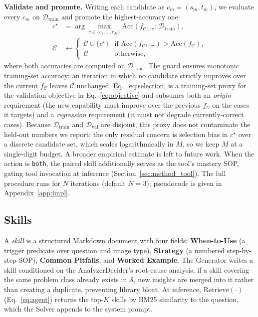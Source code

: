 \textbf{Validate and promote.}
Writing each candidate as $c_m = (s_m, t_m)$, we evaluate every $c_m$ on
$\mathcal{D}_{\text{train}}$ and promote the highest-accuracy one:
\begin{equation}
\begin{aligned}
  c^{\star} &= \arg\max_{c \in \{c_1, \dots, c_M\}}
              \mathrm{Acc}\!\left(f_{\mathcal{C} \cup c};\, \mathcal{D}_{\text{train}}\right), \\
  \mathcal{C} &\leftarrow
    \begin{cases}
      \mathcal{C} \cup \{c^{\star}\}
        & \text{if } \mathrm{Acc}(f_{\mathcal{C} \cup c^{\star}}) > \mathrm{Acc}(f_{\mathcal{C}}), \\
      \mathcal{C} & \text{otherwise,}
    \end{cases}
\end{aligned}
\label{eq:selection}
\end{equation}
where both accuracies are computed on $\mathcal{D}_{\text{train}}$. The guard ensures
monotonic training-set accuracy: an iteration in which no candidate strictly improves over
the current $f_{\mathcal{C}}$ leaves $\mathcal{C}$ unchanged.
Eq.~\ref{eq:selection} is a training-set proxy for the validation objective in
Eq.~\ref{eq:objective} and subsumes both an \emph{origin} requirement (the new capability
must improve over the previous $f_{\mathcal{C}}$ on the cases it targets) and a
\emph{regression} requirement (it must not degrade currently-correct cases). Because
$\mathcal{D}_{\text{train}}$ and $\mathcal{D}_{\text{val}}$ are disjoint, this proxy does
not contaminate the held-out numbers we report; the only residual concern is selection
bias in $c^{\star}$ over a discrete candidate set, which scales logarithmically in $M$,
so we keep $M$ at a single-digit budget. A broader empirical estimate is left to future
work.
When the action is \texttt{both}, the paired skill additionally serves as the tool's
mastery SOP, gating tool invocation at inference (Section~\ref{sec:method_tool}). The full
procedure runs for $N$ iterations (default $N{=}3$); pseudocode is given in
Appendix~\ref{app:impl}.

\subsection{Skills}
\label{sec:method_skill}

A \emph{skill} is a structured Markdown document with four fields:
\textbf{When-to-Use} (a trigger predicate over question and image type),
\textbf{Strategy} (a numbered step-by-step SOP),
\textbf{Common Pitfalls}, and
\textbf{Worked Example}.
The Generator writes a skill conditioned on the AnalyzerDecider's root-cause analysis; if a
skill covering the same problem class already exists in $\mathcal{S}$, new insights are merged
into it rather than creating a duplicate, preventing library bloat. At inference,
$\mathrm{Retrieve}(\cdot)$ (Eq.~\ref{eq:agent}) returns the top-$K$ skills by BM25
similarity to the question, which the Solver appends to the system prompt.

